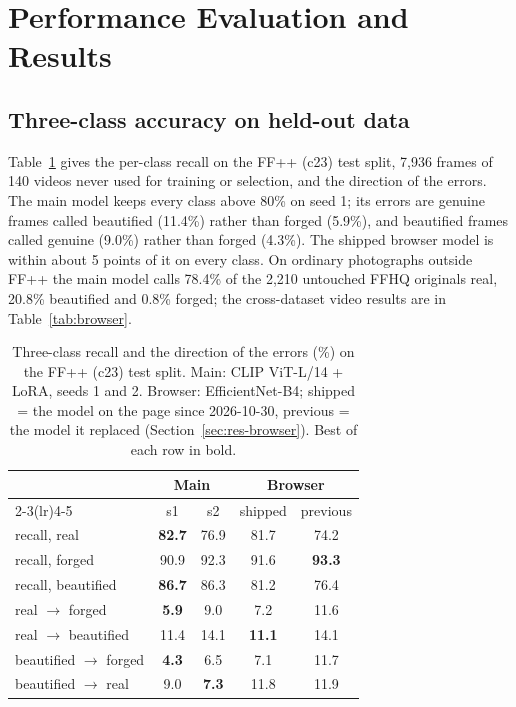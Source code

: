 \documentclass[conference,a4paper]{IEEEtran}
\begin{document}
\section{Performance Evaluation and Results}

\subsection{Three-class accuracy on held-out data}
\label{sec:res-threeclass}

Table~\ref{tab:threeclass} gives the per-class recall on the FF++ (c23) test split, 7,936 frames of 140 videos never used
for training or selection, and the direction of the errors. The main model keeps every class above 80\% on seed 1; its errors
are genuine frames called beautified (11.4\%) rather than forged (5.9\%), and beautified frames called genuine (9.0\%) rather
than forged (4.3\%). The shipped browser model is within about 5 points of it on every class. On ordinary photographs outside
FF++ the main model calls 78.4\% of the 2,210 untouched FFHQ originals real, 20.8\% beautified and 0.8\% forged; the
cross-dataset video results are in Table~\ref{tab:browser}.

\begin{table}[!htb]
\centering
\caption{Three-class recall and the direction of the errors (\%) on the FF++ (c23) test split. Main: CLIP ViT-L/14 + LoRA,
seeds 1 and 2. Browser: EfficientNet-B4; shipped = the model on the page since 2026-10-30, previous = the model it replaced
(Section~\ref{sec:res-browser}). Best of each row in bold.}
\label{tab:threeclass}
\footnotesize
\setlength{\tabcolsep}{4pt}
\begin{tabular}{@{}lcccc@{}}
\toprule
 & \multicolumn{2}{c}{Main} & \multicolumn{2}{c}{Browser} \\
\cmidrule(lr){2-3}\cmidrule(lr){4-5}
 & s1 & s2 & shipped & previous \\
\midrule
recall, real & \textbf{82.7} & 76.9 & 81.7 & 74.2 \\
recall, forged & 90.9 & 92.3 & 91.6 & \textbf{93.3} \\
recall, beautified & \textbf{86.7} & 86.3 & 81.2 & 76.4 \\
\midrule
real $\to$ forged & \textbf{5.9} & 9.0 & 7.2 & 11.6 \\
real $\to$ beautified & 11.4 & 14.1 & \textbf{11.1} & 14.1 \\
beautified $\to$ forged & \textbf{4.3} & 6.5 & 7.1 & 11.7 \\
beautified $\to$ real & 9.0 & \textbf{7.3} & 11.8 & 11.9 \\
\bottomrule
\end{tabular}
\end{table}
\end{document}
